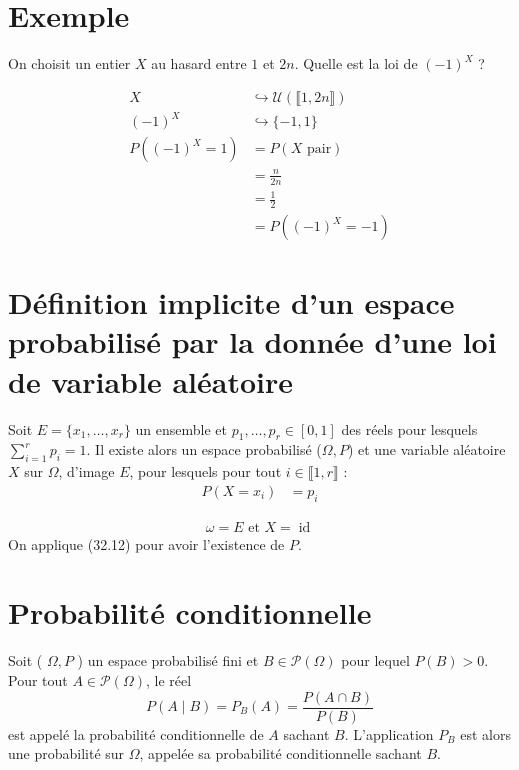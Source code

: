 \documentclass[../main.tex]{subfiles}
\begin{document}
\section{Exemple}
\begin{tcolorbox}[title=Exemple 32.26, title filled=false, colframe=darkgreen, colback=darkgreen!10!white]
    On choisit un entier $X$ au hasard entre $1$ et $2n$. Quelle est la loi de $(-1)^X$ ?
\end{tcolorbox}

\begin{align*}
    X &\hookrightarrow \mathcal{U}(\llbracket 1, 2n \rrbracket) \\
    (-1)^X &\hookrightarrow \{-1, 1\} \\
    P((-1)^X = 1) &= P(X \text{ pair}) \\
    &= \frac{n}{2n} \\
    &= \frac{1}{2} \\
    &= P((-1)^X = -1)
\end{align*}

\section{Définition implicite d'un espace probabilisé par la donnée d'une loi de variable aléatoire}
\begin{tcolorbox}[title=Théorème 32.28, title filled=false, colframe=orange, colback=orange!10!white]
    Soit $E = \{ x_1, \ldots, x_r \}$ un ensemble et $p_1, \ldots, p_r\in [0, 1]$ des réels pour lesquels $\sum\limits_{i=1}^{r} p_i = 1$. Il existe alors un espace probabilisé ($\Omega, P$) et une variable aléatoire $X$ sur $\Omega$, d'image $E$, pour lesquels pour tout $i\in \llbracket 1, r \rrbracket$ :
    \begin{align*}
        P(X = x_i) &= p_i
    \end{align*}
\end{tcolorbox}
\begin{align*}
    \omega = E \text{ et } X = \operatorname{id}
\end{align*}
On applique (32.12) pour avoir l'existence de $P$. 

\section{Probabilité conditionnelle}
\begin{tcolorbox}[title=Théorème 32.30, title filled=false, colframe=orange, colback=orange!10!white]
    Soit ( $\Omega, P$ ) un espace probabilisé fini et $B \in \mathcal{P}(\Omega)$ pour lequel $P(B)>0$. Pour tout $A \in \mathcal{P}(\Omega)$, le réel
    $$
    P(A \mid B)=P_B(A)=\frac{P(A \cap B)}{P(B)}
    $$
    est appelé la probabilité conditionnelle de $A$ sachant $B$. L'application $P_B$ est alors une probabilité sur $\Omega$, appelée sa probabilité conditionnelle sachant $B$.
\end{tcolorbox}
\end{document}
